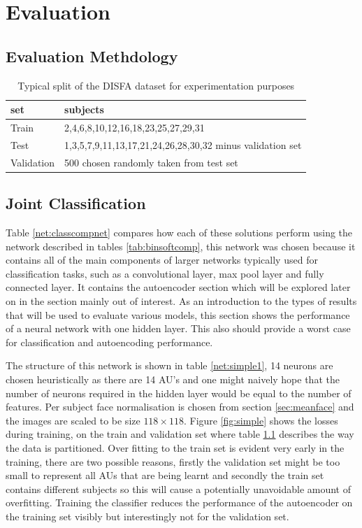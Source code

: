 
\chapter{Evaluation}
  \section{Evaluation Methdology}
    \begin{table}[h!]
      \centering
      {\footnotesize
      \begin{tabular}{|l|l|}
      \hline
      set & subjects   \\
      \hline
       Train          & 2,4,6,8,10,12,16,18,23,25,27,29,31      \\
      \hline
      Test      & 1,3,5,7,9,11,13,17,21,24,26,28,30,32 minus validation set     \\
      \hline
      Validation           & 500 chosen randomly taken from test set      \\
     \hline
      \end{tabular}
      \caption{Typical split of the DISFA dataset for experimentation purposes}
      \label{tab:splitting}  }
    \end{table}
  \section{Joint Classification}
    Table \ref{net:classcompnet} compares how each of these solutions perform using the network described in
    tables \ref{tab:binsoftcomp}, this network was chosen because it contains all of the main
    components of larger networks typically used for classification tasks, such as a convolutional
    layer, max pool layer and fully connected layer. It contains the autoencoder section which will be
    explored later on in the section mainly out of interest.
    As an introduction to the types of results that will be used to evaluate various
    models, this section shows the performance of a neural network with one
    hidden layer. This also should provide a worst case for classification and autoencoding performance.

    The structure of this network is shown in table \ref{net:simple1}, 14 neurons
    are chosen heuristically as there are 14 AU's and one might naively hope that the number of
    neurons required in the hidden layer would be equal to the number of features. Per subject face normalisation
    is chosen from section \ref{sec:meanface} and the images are scaled to be size $118 \times 118$.
    Figure \ref{fig:simple} shows the losses during training, on the train and validation set where table \ref{tab:splitting}
    describes the way the data is partitioned. Over fitting to the train set is evident very early in the training, there are two
    possible reasons, firstly the validation set might be too small to represent all AUs that are being learnt and secondly the train
    set contains different subjects so this will cause a potentially unavoidable amount of overfitting.
    Training the classifier reduces the performance of the autoencoder on the
    training set visibly but interestingly not for the validation set.




